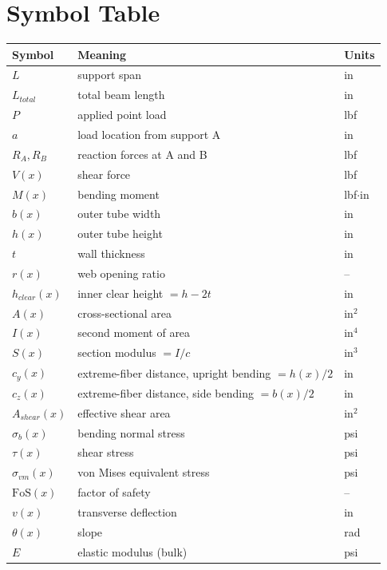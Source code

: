 \documentclass[11pt,letterpaper]{article}
\begin{document}
\section{Symbol Table}
\label{sec:symbols}

\begin{center}
\begin{tabular}{lll}
\toprule
Symbol & Meaning & Units \\
\midrule
$L$ & support span & in \\
$L_{total}$ & total beam length & in \\
$P$ & applied point load & lbf \\
$a$ & load location from support A & in \\
$R_A, R_B$ & reaction forces at A and B & lbf \\
$V(x)$ & shear force & lbf \\
$M(x)$ & bending moment & lbf$\cdot$in \\
$b(x)$ & outer tube width & in \\
$h(x)$ & outer tube height & in \\
$t$ & wall thickness & in \\
$r(x)$ & web opening ratio & -- \\
$h_{clear}(x)$ & inner clear height $= h-2t$ & in \\
$A(x)$ & cross-sectional area & in$^2$ \\
$I(x)$ & second moment of area & in$^4$ \\
$S(x)$ & section modulus $= I/c$ & in$^3$ \\
$c_y(x)$ & extreme-fiber distance, upright bending $= h(x)/2$ & in \\
$c_z(x)$ & extreme-fiber distance, side bending $= b(x)/2$ & in \\
$A_{shear}(x)$ & effective shear area & in$^2$ \\
$\sigma_b(x)$ & bending normal stress & psi \\
$\tau(x)$ & shear stress & psi \\
$\sigma_{vm}(x)$ & von Mises equivalent stress & psi \\
$\mathrm{FoS}(x)$ & factor of safety & -- \\
$v(x)$ & transverse deflection & in \\
$\theta(x)$ & slope & rad \\
$E$ & elastic modulus (bulk) & psi \\

\end{tabular}
\end{center}
\end{document}
